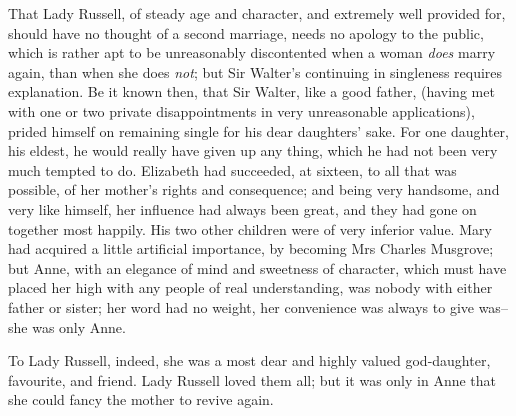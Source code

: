 \documentclass[12pt, oneside]{article}   	%
\begin{document}
That Lady Russell, of steady age and character, and extremely well
provided for, should have no thought of a second marriage, needs no
apology to the public, which is rather apt to be unreasonably
discontented when a woman \textit{does} marry again, than when she does \textit{not};
but Sir Walter’s continuing in singleness requires explanation. Be it
known then, that Sir Walter, like a good father, (having met with one
or two private disappointments in very unreasonable applications),
prided himself on remaining single for his dear daughters’ sake. For
one daughter, his eldest, he would really have given up any thing,
which he had not been very much tempted to do. Elizabeth had succeeded,
at sixteen, to all that was possible, of her mother’s rights and
consequence; and being very handsome, and very like himself, her
influence had always been great, and they had gone on together most
happily. His two other children were of very inferior value. Mary had
acquired a little artificial importance, by becoming Mrs Charles
Musgrove; but Anne, with an elegance of mind and sweetness of
character, which must have placed her high with any people of real
understanding, was nobody with either father or sister; her word had no
weight, her convenience was always to give was--she was only Anne.

To Lady Russell, indeed, she was a most dear and highly valued
god-daughter, favourite, and friend. Lady Russell loved them all; but
it was only in Anne that she could fancy the mother to revive again.
\end{document}
